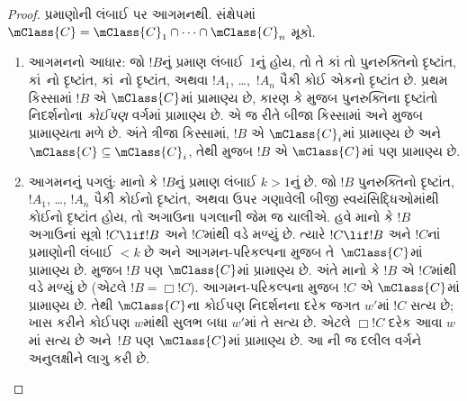 \begin{proof}
  પ્રમાણોની લંબાઈ પર આગમનથી. સંક્ષેપમાં $\mClass{C} =
  \mClass{C}_1 \cap \dots \cap \mClass{C}_n$ મૂકો.
  \begin{enumerate}
  \item આગમનનો આધાર: જો $!B$નું પ્રમાણ લંબાઈ~$1$નું હોય, તો તે
    કાં તો પુનરુક્તિનો દૃષ્ટાંત, કાં~નો દૃષ્ટાંત,
    કાં~\Dual{}નો દૃષ્ટાંત, અથવા $!A_1$, \dots,~$!A_n$ પૈકી કોઈ
    એકનો દૃષ્ટાંત છે. પ્રથમ કિસ્સામાં $!B$ એ $\mClass{C}$માં
    પ્રામાણ્ય છે, કારણ કે  મુજબ
    પુનરુક્તિના દૃષ્ટાંતો નિદર્શનોના \emph{કોઈપણ} વર્ગમાં પ્રામાણ્ય છે.
    એ જ રીતે બીજા કિસ્સામાં
     અને
       મુજબ પ્રામાણ્યતા મળે છે.
    અંતે ત્રીજા કિસ્સામાં, $!B$ એ $\mClass{C}_i$માં પ્રામાણ્ય છે અને
    $\mClass{C} \subseteq \mClass{C}_i$, તેથી
     મુજબ $!B$ એ $\mClass{C}$માં
    પણ પ્રામાણ્ય છે.
  \item આગમનનું પગલું: માનો કે $!B$નું પ્રમાણ લંબાઈ $k>1$નું છે. જો
    $!B$ પુનરુક્તિનો દૃષ્ટાંત, $!A_1$, \dots, $!A_n$ પૈકી કોઈનો
    દૃષ્ટાંત, અથવા ઉપર ગણાવેલી બીજી સ્વયંસિદ્ધિઓમાંથી કોઈનો દૃષ્ટાંત
    હોય, તો અગાઉના પગલાની જેમ જ ચાલીએ.
    હવે માનો કે $!B$ અગાઉનાં સૂત્રો $!C \lif !B$ અને $!C$માંથી
    \MP{} વડે મળ્યું છે. ત્યારે $!C \lif !B$ અને $!C$નાં પ્રમાણોની
    લંબાઈ $<k$ છે અને આગમન-પરિકલ્પના મુજબ તે~$\mClass{C}$માં પ્રામાણ્ય
    છે.  મુજબ $!B$ પણ
    $\mClass{C}$માં પ્રામાણ્ય છે. અંતે માનો કે $!B$ એ $!C$માંથી
    \Nec{} વડે મળ્યું છે (એટલે $!B = \Box!C$). આગમન-પરિકલ્પના મુજબ
    $!C$ એ $\mClass{C}$માં પ્રામાણ્ય છે. તેથી
    $\mClass{C}$ના કોઈપણ નિદર્શનના દરેક જગત $w'$માં
    $!C$ સત્ય છે; ખાસ કરીને કોઈપણ $w$માંથી સુલભ બધા
    $w'$માં તે સત્ય છે. એટલે $\Box !C$ દરેક આવા $w$માં સત્ય છે
    અને~$!B$ પણ $\mClass{C}$માં પ્રામાણ્ય છે.
    આ ની જ દલીલ વર્ગને
    અનુલક્ષીને લાગુ કરી છે.
  \end{enumerate}
\end{proof}
\endgroup


